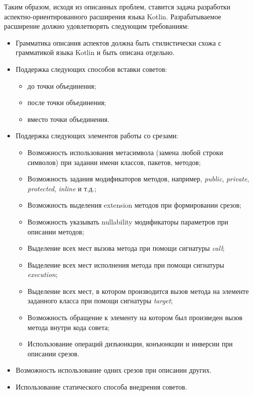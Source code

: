 Таким образом, исходя из описанных проблем, ставится задача разработки аспектно-ориентированного расширения языка Kotlin.
Разрабатываемое расширение должно удовлетворять следующим требованиям:
\begin{itemize}
    \item Грамматика описания аспектов должна быть стилистически схожа с грамматикой языка Kotlin и быть описана отдельно.
    \item Поддержка следующих способов вставки советов:
    \begin{itemize}
        \item до точки объединения;
        \item после точки объединения;
        \item вместо точки объединения.
    \end{itemize}
    \item Поддержка следующих элементов работы со срезами:
    \begin{itemize}
        \item Возможность использования метасимвола \quotes{*} (замена любой строки символов) при задании имени классов, пакетов, методов;
        \item Возможность задания модификаторов методов, например, \textit{public}, \textit{private}, \textit{protected}, \textit{inline} и т.д.;
        \item Возможность выделения extension методов при формировании срезов;
        \item Возможность указывать nullability модификаторы параметров при описании методов;
        \item Выделение всех мест вызова метода при помощи сигнатуры \textit{call};
        \item Выделение всех мест исполнения метода при помощи сигнатуры \textit{execution};
        \item Выделение всех мест, в котором производится вызов метода на элементе заданного класса при помощи сигнатуры \textit{target};
        \item Возможность обращение к элементу на котором был произведен вызов метода внутри кода совета;
        \item Использование операций дизъюнкции, конъюнкции и инверсии при описании срезов.
    \end{itemize}
    \item Возможность использование одних срезов при описании других.
    \item Использование статического способа внедрения советов.
\end{itemize}
